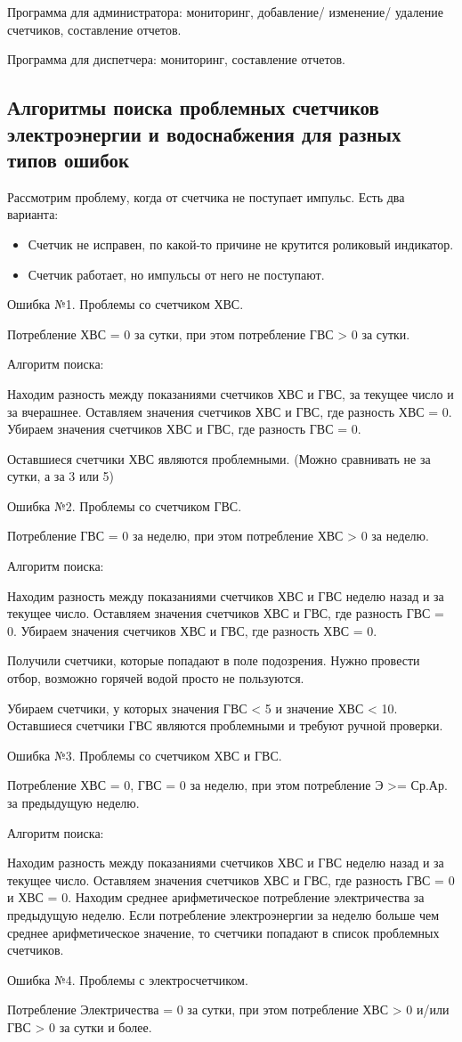 Программа для администратора: мониторинг, добавление/ изменение/ удаление счетчиков, составление отчетов. 

Программа для диспетчера:  мониторинг, составление отчетов. 


\subsection{Алгоритмы поиска проблемных счетчиков электроэнергии и водоснабжения для разных типов ошибок}
Рассмотрим проблему, когда от счетчика не поступает импульс. Есть два варианта:
\begin{itemize}
	\item Счетчик не исправен, по какой-то причине не крутится роликовый индикатор.
	\item Счетчик работает, но импульсы от него не поступают.
\end{itemize}

Ошибка №1. Проблемы со счетчиком ХВС. 

Потребление ХВС = 0 за сутки, при этом потребление ГВС > 0 за сутки.

Алгоритм поиска:

Находим разность между показаниями счетчиков ХВС и ГВС, за текущее число и за вчерашнее.
Оставляем значения счетчиков ХВС и ГВС, где разность ХВС = 0.
Убираем значения счетчиков ХВС и ГВС, где разность ГВС = 0.

Оставшиеся счетчики ХВС являются проблемными. (Можно сравнивать не за сутки, а за 3 или 5)

Ошибка №2. Проблемы со счетчиком ГВС.

Потребление ГВС = 0 за неделю, при этом потребление ХВС > 0 за неделю.

Алгоритм поиска:

Находим разность между показаниями счетчиков ХВС и ГВС неделю назад и за текущее число.
Оставляем значения счетчиков ХВС и ГВС, где разность ГВС = 0.
Убираем значения счетчиков ХВС и ГВС, где разность ХВС = 0.

Получили счетчики, которые попадают в поле подозрения.
Нужно провести отбор, возможно горячей водой просто не пользуются.

Убираем счетчики, у которых значения ГВС < 5 и значение ХВС < 10.
Оставшиеся счетчики ГВС являются проблемными и требуют ручной проверки.

Ошибка №3. Проблемы со счетчиком ХВС и ГВС.

Потребление ХВС = 0, ГВС = 0 за неделю, при этом потребление Э  >= Ср.Ар. за предыдущую неделю.

Алгоритм поиска:

Находим разность между показаниями счетчиков ХВС и ГВС неделю назад и за текущее число.
Оставляем значения счетчиков ХВС и ГВС, где разность ГВС = 0 и ХВС = 0.
Находим среднее арифметическое потребление электричества за предыдущую неделю.
Если потребление электроэнергии за неделю больше чем среднее арифметическое значение, то счетчики попадают в список проблемных счетчиков.

Ошибка №4. Проблемы с электросчетчиком.

Потребление Электричества = 0 за сутки, при этом потребление ХВС > 0 и/или ГВС > 0 за сутки и более.

